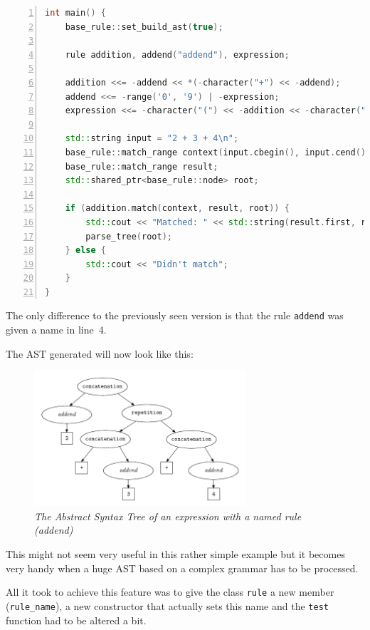 \documentclass[12pt]{article}
\begin{document}
\begin{center}
	\begin{minipage}[ht]{0.85\textwidth}
		\begin{lstlisting}[language=C++, breaklines=true, numbers=left]
int main() {
	base_rule::set_build_ast(true);

	rule addition, addend("addend"), expression;

	addition <<= -addend << *(-character("+") << -addend);
	addend <<= -range('0', '9') | -expression;
	expression <<= -character("(") << -addition << -character(")");

	std::string input = "2 + 3 + 4\n";
	base_rule::match_range context(input.cbegin(), input.cend());
	base_rule::match_range result;
	std::shared_ptr<base_rule::node> root;

	if (addition.match(context, result, root)) {
		std::cout << "Matched: " << std::string(result.first, result.second);
		parse_tree(root);
	} else {
		std::cout << "Didn't match";
	}
}
		\end{lstlisting}
	\end{minipage}
\end{center}

The only difference to the previously seen version is that the rule \texttt{addend} was given a name in
line~4.

The AST generated will now look like this:

\begin{figure}[h!]
	\centering
		\includegraphics[width=0.7\textwidth]{ast_named_rule}
		\caption{\emph{The Abstract Syntax Tree of an expression with a named rule (addend)}}
		\label{fig:ast}
\end{figure}

This might not seem very useful in this rather simple example but it becomes very handy when a huge AST based
on a complex grammar has to be processed.

All it took to achieve this feature was to give the class \texttt{rule} a new member (\texttt{rule\_name}),
a new constructor that actually sets this name and the \texttt{test} function had to be altered a bit.
\end{document}
